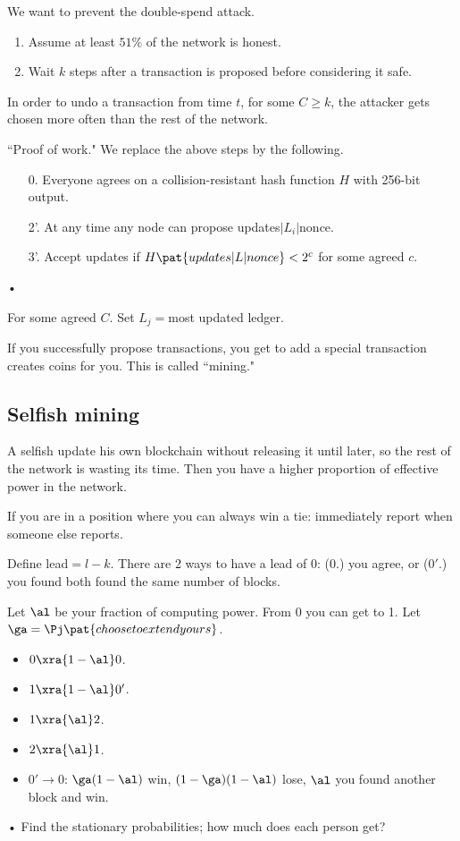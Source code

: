We want to prevent the double-spend attack. 
\begin{enumerate}
\item
Assume at least $51\%$ of the network is honest.
\item
Wait $k$ steps after a transaction is proposed before considering it safe.
\end{enumerate}
In order to undo a transaction from time $t$, for some $C\ge k$, the attacker gets chosen more often than the rest of the network.

``Proof of work." We replace the above steps by the following.
\begin{enumerate}
\item[0.] Everyone agrees on a collision-resistant hash function $H$ with 256-bit output.
\item[2'.] At any time any node can propose updates$|L_i|$nonce.
\item[3'.] Accept updates if $H\pat{updates|L|nonce}<2^c$ for some agreed $c$.
\end{enumerate}•

For some agreed $C$. Set $L_j=$most updated ledger.

If you successfully propose transactions, you get to add a special transaction creates coins for you. This is called ``mining."

\subsection{Selfish mining}
A selfish update his own blockchain without releasing it until later, so the rest of the network is wasting its time. Then you have a higher proportion of effective power in the network.

If you are in a position where you can always win a tie: immediately report when someone else reports.

Define lead$=l-k$.
There are 2 ways to have a lead of 0: (0.) you agree, or ($0'.$) you found both found the same number of blocks.

Let $\al$ be your fraction of computing power.
From 0 you can get to 1. 
Let $\ga=\Pj\pat{choose to extend yours}$. 
\begin{itemize}
\item
$0\xra{1-\al}0$.
\item
$1\xra{1-\al}0'$.
\item
$1\xra{\al}2$.
\item
$2\xra{\al}1$.
\item
$0'\to 0$: $\ga(1-\al)$ win, $(1-\ga)(1-\al)$ lose, $\al$ you found another block and win.
\end{itemize}•
Find the stationary probabilities; how much does each person get?

